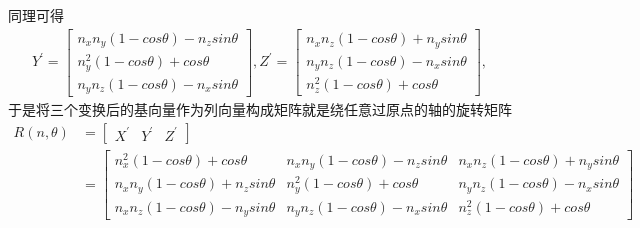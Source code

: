 同理可得
\begin{equation*}
    \begin{split}
        Y^{'} = \begin{bmatrix} n_{x}n_{y}(1 - cos\theta) - n_{z}sin\theta \\ n_{y}^{2}(1 - cos\theta) + cos\theta \\ n_{y}n_{z}(1 - cos\theta) - n_{x}sin\theta \end{bmatrix},
        Z^{'} = \begin{bmatrix} n_{x}n_{z}(1 - cos\theta) + n_{y}sin\theta \\ n_{y}n_{z}(1 - cos\theta) - n_{x}sin\theta \\ n_{z}^{2}(1 - cos\theta) + cos\theta \end{bmatrix},
    \end{split}
\end{equation*}
于是将三个变换后的基向量作为列向量构成矩阵就是绕任意过原点的轴的旋转矩阵
\begin{equation*}
    \begin{split}
        R(n, \theta) &= \begin{bmatrix} X^{'} & Y^{'} & Z^{'} \end{bmatrix} \\
        &= \begin{bmatrix} 
            n_{x}^{2}(1 - cos\theta) + cos\theta & n_{x}n_{y}(1 - cos\theta) - n_{z}sin\theta & n_{x}n_{z}(1 - cos\theta) + n_{y}sin\theta \\ 
            n_{x}n_{y}(1 - cos\theta) + n_{z}sin\theta & n_{y}^{2}(1 - cos\theta) + cos\theta & n_{y}n_{z}(1 - cos\theta) - n_{x}sin\theta \\ 
            n_{x}n_{z}(1 - cos\theta) - n_{y}sin\theta & n_{y}n_{z}(1 - cos\theta) - n_{x}sin\theta & n_{z}^{2}(1 - cos\theta) + cos\theta 
        \end{bmatrix}
    \end{split}
\end{equation*}
